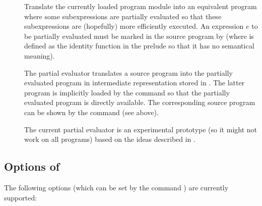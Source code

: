 \begin{description}
\item[]
Translate the currently loaded program module into an equivalent
program where some subexpressions are partially evaluated
so that these subexpressions are (hopefully) more efficiently executed.
An expression $e$ to be partially evaluated
must be marked in the source program by 
(where  is defined as the identity function in the prelude
so that it has no semantical meaning).

The partial evaluator
translates a source program  into the
partially evaluated program in intermediate representation
stored in . The latter program is implicitly loaded
by the  command so that the partially evaluated program
is directly available. The corresponding source program
can be shown by the  command (see above).

The current partial evaluator is an experimental prototype
(so it might not work on all programs) based on the ideas
described in \cite{AlbertAlpuenteHanusVidal99LPAR,AlbertHanusVidal00LPAR,%
AlbertHanusVidal01FLOPS,AlbertHanusVidal02JFLP}.

\end{description}


\subsection{Options of \CYS}
\label{sec:options}

The following options (which can be set by the command )
are currently supported:

